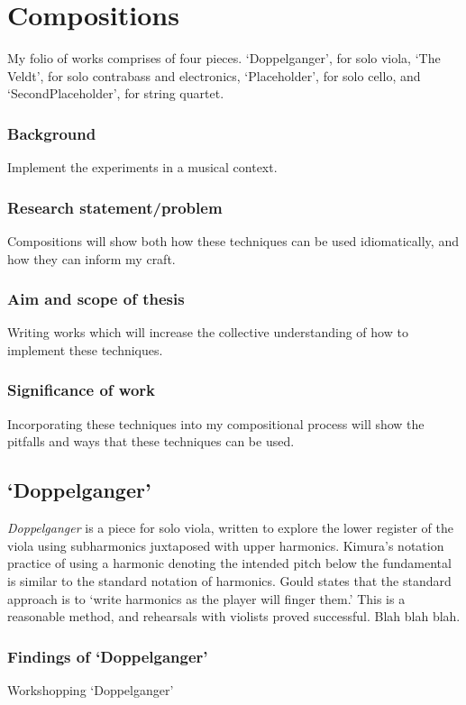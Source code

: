 
\chapter{Compositions}
My folio of works comprises of four pieces. `Doppelganger', for solo viola, `The Veldt', for solo contrabass and electronics, `Placeholder', for solo cello, and `SecondPlaceholder', for string quartet.
\subsection{Background}
Implement the experiments in a musical context.
\subsection{Research statement/problem}
Compositions will show both how these techniques can be used idiomatically, and how they can inform my craft.
\subsection{Aim and scope of thesis}
Writing works which will increase the collective understanding of how to implement these techniques.
\subsection{Significance of work}
Incorporating these techniques into my compositional process will show the pitfalls and ways that these techniques can be used.
\section{`Doppelganger'}
\textit{Doppelganger} is a piece for solo viola, written to explore the lower register of the viola using subharmonics juxtaposed with upper harmonics. Kimura's notation practice of using a harmonic denoting the intended pitch below the fundamental is similar to the standard notation of harmonics. Gould states that the standard approach is to `write harmonics as the player will finger them.'\autocite[413]{gouldBars2011} This is a reasonable method, and rehearsals with violists proved successful. Blah blah blah.

\subsection{Findings of `Doppelganger'}
Workshopping `Doppelganger' \lipsum[3]

